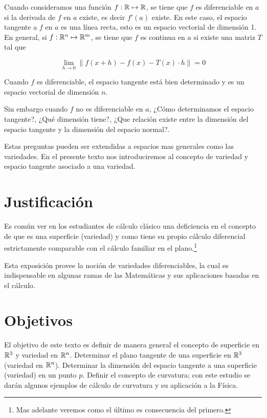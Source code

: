 Cuando consideramos una función $f:\mathbb{R}\mapsto\mathbb{R}$, se tiene que $f$ es diferenciable en $a$ si la derivada de $f$ en $a$ existe, es decir $f'(a)$ existe. En este caso, el espacio tangente a $f$ en $a$ es una línea recta, esto es un espacio vectorial de dimensión 1. En general, si $f:\mathbb{R}^{n}\mapsto\mathbb{R}^{m}$, se tiene que $f$ es continua en $a$ si existe una matriz $T$ tal que

    $$\lim_{h \to 0} \| f(x+h) - f(x) - T(x) \cdot h \| = 0$$

Cuando $f$ es diferenciable, el espacio tangente está bien determinado y es un espacio vectorial de dimensión $n$.

Sin embargo cuando $f$ no es diferenciable en $a$, ¿Cómo determinamos el espacio tangente?, ¿Qué dimensión tiene?, ¿Que relación existe entre la dimensión del espacio tangente y la dimensión del espacio normal?.

Estas preguntas pueden ser extendidas a espacios mas generales como las variedades.
En el presente texto nos introduciremos al concepto de variedad y espacio tangente asociado a una variedad.

\section{Justificación}

Es común ver en los estudiantes de cálculo clásico una deficiencia en el concepto de que es una superficie (variedad) y como tiene su propio cálculo diferencial estrictamente comparable con el cálculo familiar en el plano.\footnote{Mas adelante veremos como el último es consecuencia del primero.}

Esta exposición provee la noción de variedades diferenciables, la cual es indispensable en algunas ramas de las Matemáticas y sus aplicaciones basadas en el cálculo.

\section{Objetivos}

El objetivo de este texto es definir de manera general el concepto de superficie en $\mathbb{R}^{3}$ y variedad en $\mathbb{R}^{n}$.
Determinar el plano tangente de una superficie en $\mathbb{R}^{3}$ (variedad en $\mathbb{R}^{n}$). Determinar la dimensión del espacio tangente a una superficie (variedad) en un punto $p$. Definir el concepto de curvatura; con este estudio se darán algunos ejemplos de cálculo de curvatura y su aplicación a la Física.

